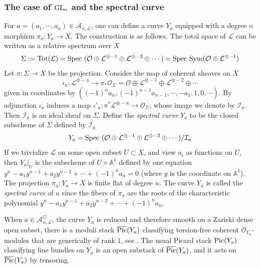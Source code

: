 \documentclass[]{pcmi}
\let\oldsubsubsection\subsubsection
\renewcommand{\subsubsection}[1]{%
\setcounter{subsubsection}{\value{equation}}%
\oldsubsubsection{#1}%
\refstepcounter{equation}%
}
\theoremstyle{plain}
\theoremstyle{definition}
\def\AA{\mathbb{A}}
\def\calA{\mathcal{A}}
\def\calI{\mathcal{I}}
\def\calL{\mathcal{L}}
\def\calO{\mathcal{O}}
\newcommand{\Pic}{\textup{Pic}}
\newcommand{\cPic}{\overline{\textup{Pic}}}
\newcommand\Spec{\textup{Spec}\ }
\newcommand\Sym{\textup{Sym}}
\newcommand\Tot{\textup{Tot}}
\newcommand\GL{\textup{GL}}
\newcommand{\Ah}{\calA^{\heartsuit}}
\begin{document}
\subsubsection{The case of $\GL_{n}$ and the spectral curve}\label{sss:spectral curve} For $a=(a_{1},\cdots, a_{n})\in\calA_{n,\calL}$, one can define a curve $Y_{a}$ equipped with a degree $n$ morphism $\pi_{a}: Y_{a}\to X$. The construction is as follows. The total space of $\calL$ can be written as a relative spectrum over $X$
\begin{equation*}
\Sigma:=\Tot(\calL)=\Spec(\calO\oplus\calL^{\otimes -1}\oplus\calL^{\otimes -2}\oplus\cdots)=\Spec\Sym(\calO\oplus\calL^{\otimes -1})
\end{equation*}
Let $\pi: \Sigma\to X$ be the projection. Consider the map of coherent sheaves on $X$
\begin{equation*}
\iota_{a}: \calL^{\otimes -n}\to \pi_{*}\calO_{\Sigma}=\calO\oplus\calL^{\otimes -1}\oplus\calL^{\otimes -2}\oplus\cdots
\end{equation*}
given in coordinates by $((-1)^{n}a_{n}, (-1)^{n-1}a_{n-1},\cdots, -a_{1},1,0,\cdots)$. By adjunction $\iota_{a}$ induces a map $\iota'_{a}: \pi^{*}\calL^{\otimes -n}\to \calO_{\Sigma}$, whose image we denote by $\calI_{a}$.  Then $\calI_{a}$ is an ideal sheaf on $\Sigma$. Define the {\em spectral curve} $Y_{a}$ to be the closed subscheme of $\Sigma$ defined by $\calI_{a}$
\begin{equation*}
Y_{a}=\Spec(\calO\oplus\calL^{\otimes-1}\oplus\calL^{\otimes-2}\oplus\cdots)/\calI_{a}
\end{equation*}
If we trivialize $\calL$ on some open subset $U\subset X$, and view $a_{i}$ as functions on $U$, then $Y_{a}|_{U}$ is the subscheme of $U\times\AA^{1}$ defined by one equation $y^{n}-a_{1}y^{n-1}+a_{2}y^{n-2}+\cdots +(-1)^{n}a_{n}=0$ (where $y$ is the coordinate on $\AA^{1}$). The projection $\pi_{a}: Y_{a}\to X$ is finite flat of degree $n$. The curve $Y_{a}$ is called the {\em spectral curve} of $a$ since the fibers of $\pi_{a}$ are the roots of the characteristic polynomial $y^{n}-a_{1}y^{n-1}+a_{2}y^{n-2}+\cdots +(-1)^{n}a_{n}$.

When $a\in\Ah_{n,\calL}$,  the curve $Y_{a}$ is reduced and therefore smooth on a Zariski dense open subset, there is a moduli stack $\cPic(Y_{a})$ classifying torsion-free coherent $\calO_{Y_{a}}$-modules that are generically of rank $1$, see \cite{AK}. The usual Picard stack $\Pic(Y_{a})$ classifying line bundles on $Y_{a}$ is an open substack of $\cPic(Y_{a})$, and it acts on $\cPic(Y_{a})$ by tensoring.
\end{document}
